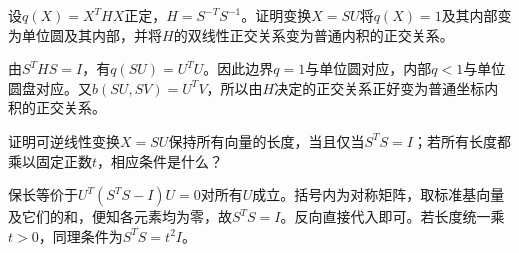 设\(q(X)=X^THX\)正定，\(H=S^{-T}S^{-1}\)。证明变换\(X=SU\)将\(q(X)=1\)及其内部变为单位圆及其内部，并将\(H\)的双线性正交关系变为普通内积的正交关系。
\par
\solutionanswer
由\(S^THS=I\)，有\(q(SU)=U^TU\)。因此边界\(q=1\)与单位圆对应，内部\(q<1\)与单位圆盘对应。又\(b(SU,SV)=U^TV\)，所以由\(H\)决定的正交关系正好变为普通坐标内积的正交关系。


证明可逆线性变换\(X=SU\)保持所有向量的长度，当且仅当\(S^TS=I\)；若所有长度都乘以固定正数\(t\)，相应条件是什么？
\par
\solutionanswer
保长等价于\(U^T(S^TS-I)U=0\)对所有\(U\)成立。括号内为对称矩阵，取标准基向量及它们的和，便知各元素均为零，故\(S^TS=I\)。反向直接代入即可。若长度统一乘\(t>0\)，同理条件为\(S^TS=t^2I\)。
\par
